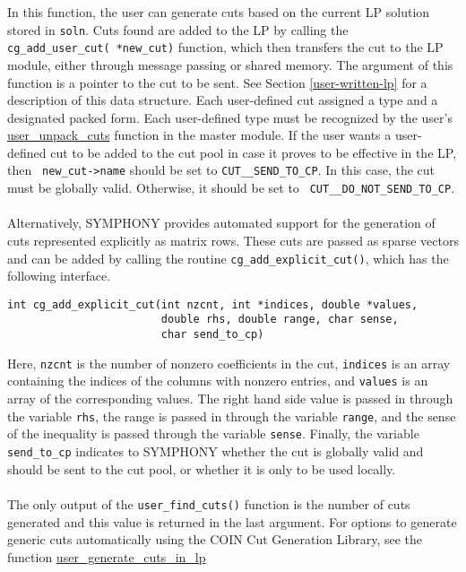 \bd

\describe

In this function, the user can generate cuts based on the current LP solution
stored in {\tt soln}. Cuts found are added to the LP by calling the {\tt
cg\_add\_user\_cut( *new\_cut)} function, which
then transfers the cut to the LP module, either through message passing or
shared memory.  The argument of this function is a pointer to the cut to be
sent. See Section \ref{user-written-lp} for a description of this data
structure. Each user-defined cut assigned a type and a designated packed
form. Each user-defined type must be recognized by the user's \hyperref{{\tt
user\_unpack\_cuts()}}{{\tt user\_unpack\_cuts()}}{}{user_unpack_cuts}
function in the master module. If the user wants a user-defined cut to be
added to the cut pool in case it proves to be effective in the LP, then {\tt
new\_cut->name} should be set to {\tt CUT\_\_SEND\_TO\_CP}. In this case, the
cut must be globally valid. Otherwise, it should be set to {\tt
CUT\_\_DO\_NOT\_SEND\_TO\_CP}. \\
\\
Alternatively, SYMPHONY provides automated support for the generation of cuts
represented explicitly as matrix rows. These cuts are passed as sparse vectors
and can be added by calling the routine \texttt{cg\_add\_explicit\_cut()},
which has the following interface.
\begin{verbatim}
int cg_add_explicit_cut(int nzcnt, int *indices, double *values,
                        double rhs, double range, char sense, 
                        char send_to_cp)
\end{verbatim}
Here, \texttt{nzcnt} is the number of nonzero coefficients in the cut,
\texttt{indices} is an array containing the indices of the columns with
nonzero entries, and \texttt{values} is an array of the corresponding
values. The right hand side value is passed in through the variable
\texttt{rhs}, the range is passed in through the variable \texttt{range}, and
the sense of the inequality is passed through the variable
\texttt{sense}. Finally, the variable \texttt{send\_to\_cp} indicates to
SYMPHONY whether the cut is globally valid and should be sent to the cut pool,
or whether it is only to be used locally.\\
\\
The only output of the \texttt{user\_find\_cuts()} function is the number of
cuts generated and this value is returned in the last argument. For options to
generate generic cuts automatically using the COIN Cut Generation Library, see
the function \hyperref{{\tt user\_generate\_cuts\_in\_lp()}}{{\tt
user\_generate\_cuts\_in\_lp()}}{}{user_generate_cuts_in_lp}\\
\\

